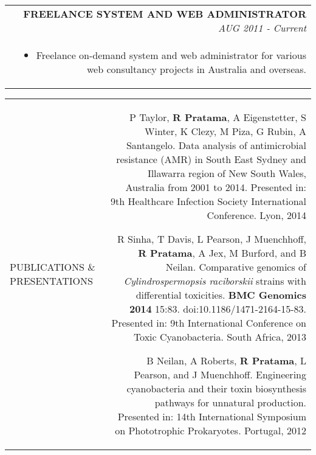 \documentclass[a4paper,10pt]{article}
\newcommand\VRule{\color{lightgray}\vrule}
\newcommand\HRule{}
\begin{document}
\begin{tabular}{L!{\VRule}R}
& \textbf{\uppercase{Freelance system and web administrator}} \hfill\small \textit{AUG 2011 - Current} \\
& \begin{itemize}
\item Freelance on-demand system and web administrator for various web consultancy projects in Australia and overseas.

\end{itemize}



\end{tabular}


\vspace{0.15in}
\begin{tabular}{L!{\VRule}R}
\uppercase{Publications \& Presentations \HRule} &  
  
P Taylor, \textbf{R Pratama}, A Eigenstetter, S Winter, K Clezy, M Piza, G Rubin, A Santangelo. Data analysis of antimicrobial resistance (AMR) in South East Sydney and Illawarra region of New South Wales, Australia from 2001 to 2014. Presented in: 9th Healthcare Infection Society International Conference. Lyon, 2014
  \vspace{0.10in}

R Sinha, T Davis, L Pearson, J Muenchhoff, \textbf{R Pratama}, A Jex, M Burford, and B Neilan.
Comparative genomics of \textit{Cylindrospermopsis raciborskii} strains with differential toxicities. \textbf{BMC Genomics 2014} 15:83. doi:10.1186/1471-2164-15-83. Presented in: 9th International Conference on Toxic Cyanobacteria. South Africa, 2013
  \vspace{0.10in}
  
B Neilan, A Roberts, \textbf{R Pratama}, L Pearson, and J Muenchhoff.
Engineering cyanobacteria and their toxin biosynthesis  pathways for unnatural production.
Presented in: 14th International Symposium on Phototrophic Prokaryotes. Portugal, 2012
  \vspace{0.10in}

\end{tabular}

\vspace{0.15in}
\end{document}
